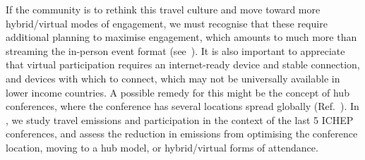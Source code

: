 \documentclass[../SustainableHEP.tex]{subfiles}
\begin{document}
If the community is to rethink this travel culture and move toward more hybrid/virtual modes of engagement, we must recognise that these require additional planning to maximise engagement, which amounts to much more than streaming the in-person event format (see~). It is also important to appreciate that virtual participation requires an internet-ready device and stable connection, and devices with which to connect, which may not be universally available in lower income countries. A possible remedy for this might be the concept of hub conferences, where the conference has several locations spread globally (\eg Ref.~\cite{Parncutt}).  In , we study travel emissions and participation in the context of the last 5 ICHEP conferences, and assess the reduction in emissions from optimising the conference location, moving to a hub model, or hybrid/virtual forms of attendance.

\clearpage

\end{document}
